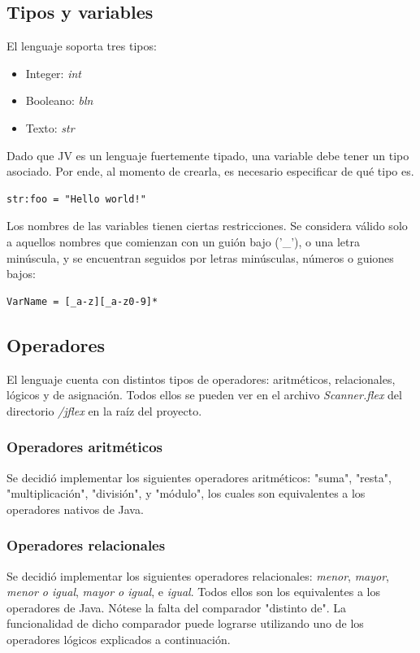 \documentclass{article}
\begin{document}
        \subsection{Tipos y variables}
            \par El lenguaje soporta tres tipos:
            \begin{itemize}
                \item Integer: \textit{int}
                \item Booleano: \textit{bln}
                \item Texto: \textit{str}
            \end{itemize}
            \par Dado que JV es un lenguaje fuertemente tipado, una variable debe tener un tipo asociado. Por ende, al momento de crearla, es necesario especificar de qué tipo es.
            \begin{lstlisting}
str:foo = "Hello world!"
            \end{lstlisting}
            \par Los nombres de las variables tienen ciertas restricciones. Se considera válido solo a aquellos nombres que comienzan con un guión bajo ('\_'), o una letra minúscula, y se encuentran seguidos por letras minúsculas, números o guiones bajos:
            \begin{lstlisting}
VarName = [_a-z][_a-z0-9]*
            \end{lstlisting}

        \subsection{Operadores}
            \par El lenguaje cuenta con distintos tipos de operadores: aritméticos, relacionales, lógicos y de asignación. Todos ellos se pueden ver en el archivo \textit{Scanner.flex} del directorio \textit{/jflex} en la raíz del proyecto.
            \subsubsection{Operadores aritméticos}
                \par Se decidió implementar los siguientes operadores aritméticos: "suma", "resta", "multiplicación", "división", y "módulo", los cuales son equivalentes a los operadores nativos de Java.
            \subsubsection{Operadores relacionales}
                \par Se decidió implementar los siguientes operadores relacionales: \textit{menor}, \textit{mayor}, \textit{menor o igual}, \textit{mayor o igual}, e \textit{igual}. Todos ellos son los equivalentes a los operadores de Java. Nótese la falta del comparador "distinto de". La funcionalidad de dicho comparador puede lograrse utilizando uno de los operadores lógicos explicados a continuación.
\end{document}
